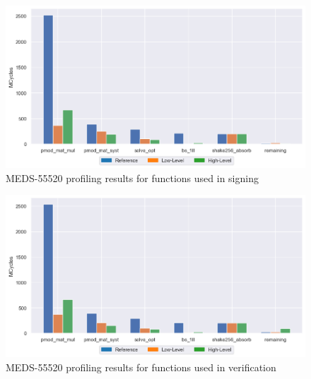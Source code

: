 \documentclass[11pt,a4paper]{report}
\theoremstyle{definition}
\begin{document}
\begin{figure}
  \centering
  \includegraphics[width=\textwidth]{plots/barplot_MEDS-55520_profile_sign.png}
  \caption{MEDS-55520 profiling results for functions used in signing}
  \label{fig:results_profile_signing_MEDS-55520}
\end{figure}

\begin{figure}
  \centering
  \includegraphics[width=\textwidth]{plots/barplot_MEDS-55520_profile_verify.png}
  \caption{MEDS-55520 profiling results for functions used in verification}
  \label{fig:results_profile_verify_MEDS-55520}
\end{figure}
\end{document}
